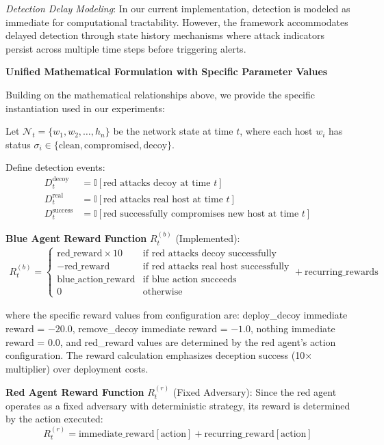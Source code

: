 \documentclass[12pt,oneside]{article}
\begin{document}
\textit{Detection Delay Modeling}: In our current implementation, detection is modeled as immediate for computational tractability. However, the framework accommodates delayed detection through state history mechanisms where attack indicators persist across multiple time steps before triggering alerts.

\textbf{Unified Mathematical Formulation with Specific Parameter Values}

Building on the mathematical relationships above, we provide the specific instantiation used in our experiments:

Let $\mathcal{N}_t = \{w_1, w_2, \ldots, h_n\}$ be the network state at time $t$, where each host $w_i$ has status $\sigma_i \in \{\text{clean}, \text{compromised}, \text{decoy}\}$. 

Define detection events:
\begin{align}
D_t^{\text{decoy}} &= \mathbb{I}[\text{red attacks decoy at time } t] \\
D_t^{\text{real}} &= \mathbb{I}[\text{red attacks real host at time } t] \\
D_t^{\text{success}} &= \mathbb{I}[\text{red successfully compromises new host at time } t]
\end{align}

\textbf{Blue Agent Reward Function} $R_t^{(b)}$ (Implemented):
\begin{align}
R_t^{(b)} = \begin{cases}
\text{red\_reward} \times 10 & \text{if red attacks decoy successfully} \\
-\text{red\_reward} & \text{if red attacks real host successfully} \\
\text{blue\_action\_reward} & \text{if blue action succeeds} \\
0 & \text{otherwise}
\end{cases} + \text{recurring\_rewards}
\end{align}

where the specific reward values from configuration are: deploy\_decoy immediate reward = $-20.0$, remove\_decoy immediate reward = $-1.0$, nothing immediate reward = $0.0$, and red\_reward values are determined by the red agent's action configuration. The reward calculation emphasizes deception success (10× multiplier) over deployment costs.

\textbf{Red Agent Reward Function} $R_t^{(r)}$ (Fixed Adversary):
Since the red agent operates as a fixed adversary with deterministic strategy, its reward is determined by the action executed:
\begin{equation}
R_t^{(r)} = \text{immediate\_reward}[\text{action}] + \text{recurring\_reward}[\text{action}]
\end{equation}
\end{document}

